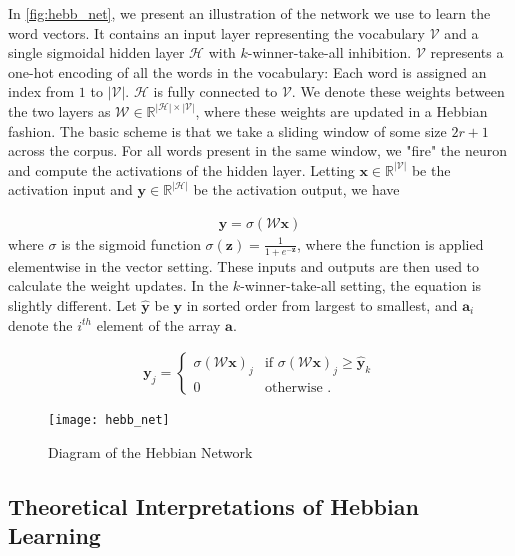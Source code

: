 \documentclass[12pt, usenames]{article}
\theoremstyle{definition}
\theoremstyle{definition}
\theoremstyle{definition}
\newcommand{\mc}[1]
{\mathcal{#1}}
\newcommand{\vv}[1]
{\textbf{#1}}
\begin{document}
In \autoref{fig:hebb_net}, we present an illustration of the network we use to learn the word vectors. It contains
an input layer representing the vocabulary $\mc{V}$ and a single sigmoidal hidden layer $\mc{H}$ with $k$-winner-take-all inhibition. $\mc{V}$ represents a one-hot encoding of all the words in the vocabulary: Each word is assigned an index from $1$ to $|\mc{V}|$. $\mc{H}$ is fully connected to $\mc{V}$. We denote these weights between the two layers as $\mc{W} \in \mathbb{R}^{|\mc{H}| \times |\mc{V}|}$, where these weights are updated in a Hebbian fashion. The basic scheme is that we take a sliding window of some size $2r + 1$ across the corpus. For all words present in the same window, we "fire" the neuron and compute the activations of the hidden layer. Letting $\vv{x} \in \mathbb{R}^{|\mc{V}|}$ be the activation input and $\vv{y} \in \mathbb{R}^{|\mc{H}|}$ be the activation output, we have 

\begin{align}
\label{eq:nn_out}
\vv{y} = \sigma\left(\mc{W}\vv{x}\right)
\end{align}
where $\sigma$ is the sigmoid function $\sigma(\vv{z}) = \frac{1}{1 + e^{-\vv{z}}}$, where the function is applied elementwise in the vector setting. These inputs and outputs are then used to calculate the weight updates. In the $k$-winner-take-all setting, the equation is slightly different. Let $\hat{\vv{y}}$ be $\vv{y}$ in sorted order from largest to smallest, and $\vv{a}_i$ denote the $i^{th}$ element of the array $\vv{a}$.

\begin{align}
\label{eq:nn_out_kwta}
\vv{y}_j = \begin{cases} \sigma\left(\mc{W}\vv{x}\right)_j &\mbox{if } \sigma\left(\mc{W}\vv{x}\right)_j \geq \hat{\vv{y}}_k \\ 
0 & \mbox{otherwise }. \end{cases} 
\end{align}

\begin{figure}
\texttt{[image: hebb\_net]}
\centering
\caption{Diagram of the Hebbian Network}
\label{fig:hebb_net}
\end{figure}

\subsection{Theoretical Interpretations of Hebbian Learning}
\end{document}
